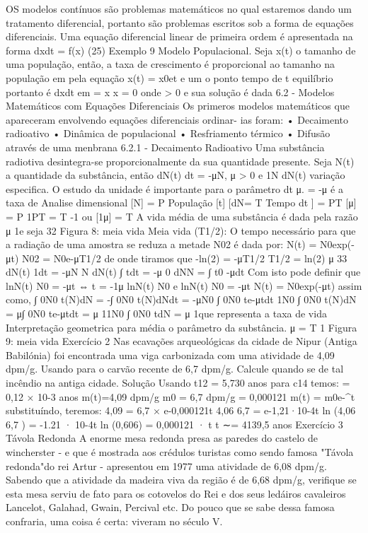 {{{{{{{{{{OS modelos contínuos são problemas matemáticos no qual estaremos dando um tratamento diferencial, portanto são problemas escritos sob a forma de equações diferenciais. Uma equação diferencial linear de primeira ordem é apresentada na forma 
dxdt = f(x) (25) 
Exemplo 9 Modelo Populacional. 
Seja x(t) o tamanho de uma população, então, a taxa de crescimento é proporcional ao tamanho na população em pela equação x(t) = x0e\gamma t e um o ponto tempo de t equilíbrio portanto é dxdt em = x \gamma x = 0 
onde \gamma  > 0 e sua solução é dada 
6.2 - Modelos Matemáticos com Equações Diferenciais 
Os primeros modelos matemáticos que apareceram envolvendo equações diferenciais ordinar- ias foram: 
• Decaimento radioativo 
• Dinâmica de populacional 
• Resfriamento térmico 
• Difusão através de uma menbrana 
6.2.1 - Decaimento Radioativo 
Uma substância radiotiva desintegra-se proporcionalmente da sua quantidade presente. Seja N(t) a quantidade da substância, então dN(t) 
dt = -μN, μ > 0 e 1N 
dN(t) variação especifica. O estudo da unidade é importante para o parâmetro dt μ. 
= -μ é a taxa de 
Analise dimensional [N] = P \Rightarrow População [t] [dN= T \Rightarrow Tempo dt 
] 
= PT 
[μ] = P 
1PT = T -1 ou 
[1μ] 
= T 
A vida média de uma substância é dada pela razão μ 1e seja 
32 
Figura 8: meia vida 
Meia vida (T1/2): O tempo necessário para que a radiação de uma amostra se reduza a metade N02 é dada por: 
N(t) = N0exp(-μt) N02 = N0e-μT1/2 de onde tiramos que -ln(2) = -μT1/2 \Rightarrow  T1/2 = ln(2) 
μ 
33 
dN(t) 1dt = -μN N 
dN(t) ∫ tdt = -μ 0 dNN = ∫ t0 -μdt 
Com isto pode definir que 
lnN(t) 
N0 = -μt ⇔ t = -1μ lnN(t) 
N0 e 
lnN(t) 
N0 = -μt \Rightarrow  N(t) = N0exp(-μt) assim como, 
∫ 0N0 t(N)dN = -∫ 0N0 t(N)dNdt = -μN0 
∫ 0N0 te-μtdt 1N0 
∫ 0N0 t(N)dN = μ∫ 0N0 te-μtdt = μ 1\Rightarrow  1N0 
∫ 0N0 tdN = μ 1que representa a taxa de vida Interpretação geometrica para média o parâmetro da substância. 
μ = T 1
Figura 9: meia vida 
Exercício 2 Nas ecavações arqueológicas da cidade de Nipur (Antiga Babilónia) foi encontrada uma viga carbonizada com uma atividade de 4,09 dpm/g. Usando para o carvão recente de 6,7 dpm/g. Calcule quando se de tal incêndio na antiga cidade. 
Solução Usando t12 = 5,730 anos para c14 temos: \lambda = 0,12 × 10-3 anos m(t)=4,09 dpm/g m0 = 6,7 dpm/g \lambda = 0,000121 m(t) = m0e-\lambda^{t} substituíndo, teremos: 4,09 = 6,7 × e-0,000121t 4,06 
6,7 = e-1,21·10-4t 
ln 
(4,06 
6,7 
) 
= -1.21 · 10-4t 
ln (0,606) = 0,000121 · t \Rightarrow  t ∼= 4139,5 anos 
Exercício 3 Távola Redonda 
A enorme mesa redonda presa as paredes do castelo de wincherster - e que é mostrada aos crédulos turistas como sendo famosa "Távola redonda"do rei Artur - apresentou em 1977 uma atividade de 6,08 dpm/g. Sabendo que a atividade da madeira viva da região é de 6,68 dpm/g, verifique se esta mesa serviu de fato para os cotovelos do Rei e dos seus ledáiros cavaleiros Lancelot, Galahad, Gwain, Percival etc. Do pouco que se sabe dessa famosa confraria, uma coisa é certa: viveram no século V. 
}}}}}}}}}}
